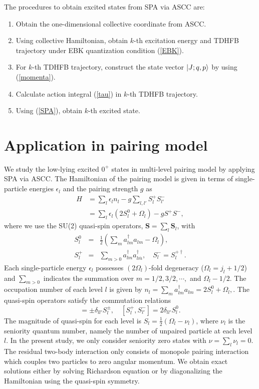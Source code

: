 \documentclass[%
superscriptaddress,
showpacs,
nofootinbib,
amsmath,amssymb,
aps,
prc,
twocolumn,
floatfix ]%
{revtex4-1}
\begin{document}
The procedures to obtain excited states from SPA via ASCC are:
\begin{enumerate}
\item Obtain the one-dimensional collective coordinate from ASCC.
\item Using collective Hamiltonian, obtain $k$-th excitation energy and TDHFB trajectory under EBK quantization condition (\ref{EBK}).
\item For $k$-th TDHFB trajectory, construct the state vector $\ket{J;q,p}$ by using (\ref{momenta}).
\item Calculate action integral (\ref{tau}) in $k$-th TDHFB trajectory.
\item Using (\ref{SPA}), obtain $k$-th excited state.
\end{enumerate}


\section{Application in pairing model}
\label{sec3}

We study the low-lying excited $0^+$ states in multi-level pairing model by applying SPA via ASCC. 
The Hamiltonian of the pairing model is given in terms of
single-particle energies $\epsilon_l$ and the pairing strength $g$ as
\begin{align}
	H &= \sum_l \epsilon_l n_l - g \sum_{l,l'} S_l^+ S_{l'}^- \nonumber \\
    &= \sum_l\epsilon_l(2S_l^0+\Omega_l) - g S^+ S^{-} ,
\end{align}
where we use the SU(2) quasi-spin operators,
$\boldsymbol{S}=\sum_l \boldsymbol{S}_l$, with
\begin{eqnarray}
        S_l^0 &=& \frac{1}{2}(\sum_ma_{lm}^{\dag}a_{lm}-\Omega_l) ,\\
        S_l^{+} &=& \sum_{m>0}a_{lm}^{\dag}a_{l\overline{m}}^{\dag} ,
\quad   S_l^{-} = S_l^{+\dag} .
\end{eqnarray}
Each single-particle energy $\epsilon_l$ possesses $(2\Omega_l)$-fold
degeneracy ($\Omega_l=j_l+1/2$)
and $\sum_{m>0}$ indicates the summation over $m=1/2,3/2,\cdots,$ and $\Omega_l-1/2$.
The occupation number of each level $l$ is given by
$
	n_l = \sum_m a^{\dag}_{lm}a_{lm} = 2S_l^0+\Omega_l ,
$.
The quasi-spin operators satisfy the commutation relations
\begin{equation}
  [S_l^0,S_{l'}^{\pm}] = \pm\delta_{ll'}S_{l}^{\pm},
	\quad [S_{l}^{+},S_{l'}^{-}] = 2\delta_{ll'}S_{l}^{0} .
\end{equation}
The magnitude of quasi-spin for each level is
$S_l=\frac{1}{2}(\Omega_l-\nu_l)$, where $\nu_l$ is the seniority
quantum number, namely the number of unpaired particle at each level $l$.
In the present study, we only consider seniority zero states with
$\nu=\sum_l \nu_l=0$.
The residual two-body interaction only consists of monopole pairing
interaction which couples two particles to zero angular momentum.
We obtain exact solutions either by solving Richardson equation
\cite{Richardson,Richardson2,Richardson3} or
by diagonalizing the Hamiltonian using the quasi-spin symmetry.
\end{document}
